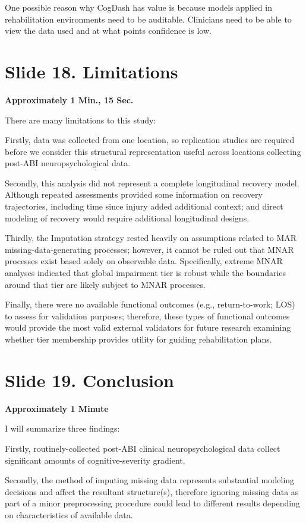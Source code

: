 \documentclass[
  11pt,
]{article}
\begin{document}
One possible reason why CogDash has value is because models applied in
rehabilitation environments need to be auditable. Clinicians need to be
able to view the data used and at what points confidence is low.

\section{Slide 18. Limitations}\label{slide-18.-limitations}

\textbf{Approximately 1 Min., 15 Sec.}

There are many limitations to this study:

Firstly, data was collected from one location, so replication studies
are required before we consider this structural representation useful
across locations collecting post-ABI neuropsychological data.

Secondly, this analysis did not represent a complete longitudinal
recovery model. Although repeated assessments provided some information
on recovery trajectories, including time since injury added additional
context; and direct modeling of recovery would require additional
longitudinal designs.

Thirdly, the Imputation strategy rested heavily on assumptions related
to MAR missing-data-generating processes; however, it cannot be ruled
out that MNAR processes exist based solely on observable data.
Specifically, extreme MNAR analyses indicated that global impairment
tier is robust while the boundaries around that tier are likely subject
to MNAR processes.

Finally, there were no available functional outcomes (e.g.,
return-to-work; LOS) to assess for validation purposes; therefore, these
types of functional outcomes would provide the most valid external
validators for future research examining whether tier membership
provides utility for guiding rehabilitation plans.

\section{Slide 19. Conclusion}\label{slide-19.-conclusion}

\textbf{Approximately 1 Minute}

I will summarize three findings:

Firstly, routinely-collected post-ABI clinical neuropsychological data
collect significant amounts of cognitive-severity gradient.

Secondly, the method of imputing missing data represents substantial
modeling decisions and affect the resultant structure(s), therefore
ignoring missing data as part of a minor preprocessing procedure could
lead to different results depending on characteristics of available
data.
\end{document}
